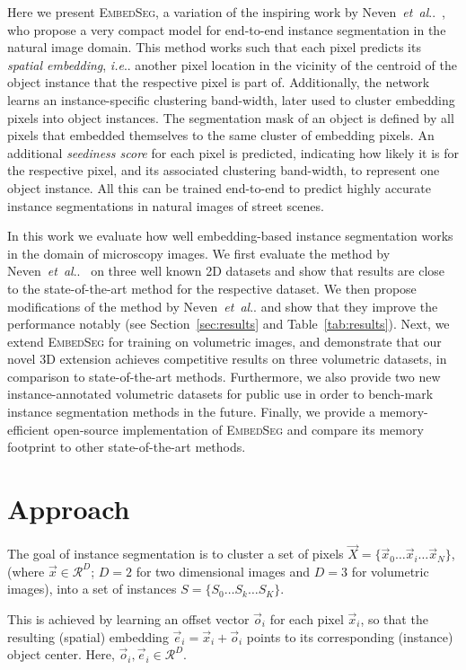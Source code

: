 \documentclass{midl} %
\makeatletter
\newcommand{\EmbedSeg}{\mbox{\textsc{EmbedSeg}}\xspace}
\DeclareRobustCommand\onedot{\futurelet\@let@token\@onedot}
\def\@onedot{\ifx\@let@token.\else.\null\fi\xspace}
\def\ie{\emph{i.e}\onedot} \def\Ie{\emph{I.e}\onedot}
\def\etal{\emph{et~al}\onedot}
\makeatother
\begin{document}
Here we present \EmbedSeg, a variation of the inspiring work by Neven~\etal~\cite{neven2019}, who propose a very compact model for end-to-end instance segmentation in the natural image domain.
This method works such that each pixel predicts its \textit{spatial embedding}, \ie another pixel location in the vicinity of the centroid of the object instance that the respective pixel is part of. 
Additionally, the network learns an instance-specific clustering band-width, later used to cluster embedding pixels into object instances. 
The segmentation mask of an object is defined by all pixels that embedded themselves to the same cluster of embedding pixels.
An additional \textit{seediness score} for each pixel is predicted, indicating how likely it is for the respective pixel, and its associated clustering band-width, to represent one object instance. 
All this can be trained end-to-end to predict highly accurate instance segmentations in natural images of street scenes.

In this work we evaluate how well embedding-based instance segmentation works in the domain of microscopy images.
We first evaluate the method by Neven~\etal~\cite{neven2019} on three well known 2D datasets and show that results are close to the state-of-the-art method for the respective dataset.
We then propose modifications of the method by Neven~\etal and show that they improve the performance notably (see Section~\ref{sec:results} and Table~\ref{tab:results}).
Next, we extend \EmbedSeg for training on volumetric images, and demonstrate that our novel 3D extension achieves competitive results on three volumetric datasets, in comparison to state-of-the-art methods.
Furthermore, we also provide two new instance-annotated volumetric datasets for public use in order to bench-mark instance segmentation methods in the future.
Finally, we provide a memory-efficient open-source implementation of \EmbedSeg and compare its memory footprint to other state-of-the-art methods.

\section{Approach}
The goal of instance segmentation is to cluster a set of pixels $\vec{X}= \{ \vec{x}_{0} \ldots \vec{x}_{i} \ldots \vec{x}_{N} \}$, (where $\vec{x} \in \mathcal{R}^{D}$; $D = 2$ for two dimensional images and $D = 3$ for volumetric images), into a set of instances $S=\{ {S_{0} \ldots S_{k} \ldots S_{K}} \}$.

This is achieved by learning an offset vector $\vec{o}_{i}$ for each pixel $\vec{x}_{i}$, so that the resulting (spatial) embedding $\vec{e}_{i}=\vec{x}_{i}+\vec{o}_{i}$ points to its corresponding (instance) object center.
Here, $\vec{o}_{i}, \vec{e}_{i} \in \mathcal{R}^{D}$.
\end{document}
